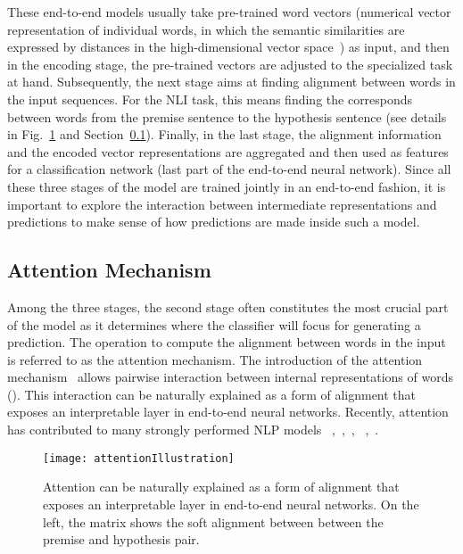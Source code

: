 These end-to-end models usually take pre-trained word vectors (numerical vector representation of individual words, in which the semantic similarities are expressed by distances in the high-dimensional vector space~\cite{MikolovSutskeverChen2013, PenningtonSocherManning2014}) as input, and then in the encoding stage, the pre-trained vectors are adjusted to the specialized task at hand. Subsequently, the next stage aims at finding alignment between words in the input sequences. For the NLI task, this means finding the corresponds between words from the premise sentence to the hypothesis sentence (see details in Fig.~\ref{fig:attention} and Section~\ref{sec:attention}). Finally, in the last stage, the alignment information and the encoded vector representations are aggregated and then used as features for a classification network (last part of the end-to-end neural network).
%
Since all these three stages of the model are trained jointly in an end-to-end fashion, it is important to explore the interaction between intermediate representations and predictions to make sense of how predictions are made inside such a model.

\subsection{Attention Mechanism}
\label{sec:attention}
Among the three stages, the second stage often constitutes the most crucial part of the model as it determines where the classifier will focus for generating a prediction. The operation to compute the alignment between words in the input is referred to as the attention mechanism. 
The introduction of the attention mechanism~\cite{bahdanau2014neural} allows
pairwise interaction between internal representations of words (). 
This interaction can be naturally explained as a form of alignment that exposes an interpretable layer in end-to-end neural networks.
%
Recently, attention has contributed to many strongly performed NLP models
~\cite{parikh2016emnlp},~\cite{rush2015neural},~\cite{yang2016hierarchical},
~\cite{seo2016bidirectional},~\cite{schwartz2017high}.

\begin{figure}[htbp]
\centering
\vspace{-2mm}
 \texttt{[image: attentionIllustration]}
 \caption{Attention can be naturally explained as a form of alignment that exposes an interpretable layer in end-to-end neural networks. On the left, the matrix shows the soft alignment between between the premise and hypothesis pair.}
\label{fig:attention}
\end{figure}

